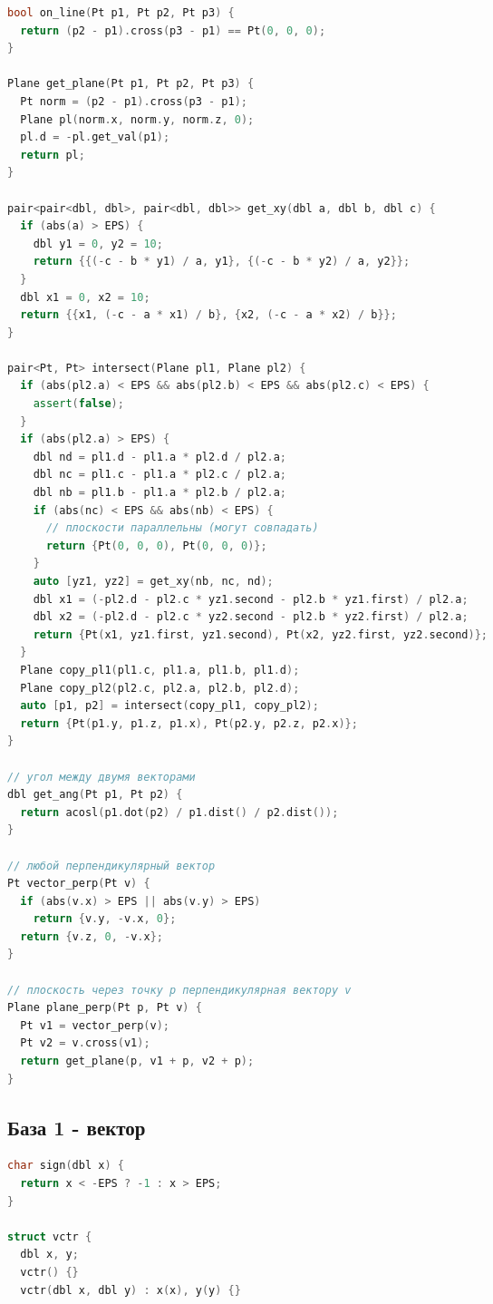 \documentclass[9pt,a4paper,landscape,twosided]{extarticle}
\begin{document}
\begin{multicols*}{3}
\begin{lstlisting}[language=C++]
bool on_line(Pt p1, Pt p2, Pt p3) {
  return (p2 - p1).cross(p3 - p1) == Pt(0, 0, 0);
}

Plane get_plane(Pt p1, Pt p2, Pt p3) {
  Pt norm = (p2 - p1).cross(p3 - p1);
  Plane pl(norm.x, norm.y, norm.z, 0);
  pl.d = -pl.get_val(p1);
  return pl;
}

pair<pair<dbl, dbl>, pair<dbl, dbl>> get_xy(dbl a, dbl b, dbl c) {
  if (abs(a) > EPS) {
    dbl y1 = 0, y2 = 10;
    return {{(-c - b * y1) / a, y1}, {(-c - b * y2) / a, y2}};
  }
  dbl x1 = 0, x2 = 10;
  return {{x1, (-c - a * x1) / b}, {x2, (-c - a * x2) / b}};
}

pair<Pt, Pt> intersect(Plane pl1, Plane pl2) {
  if (abs(pl2.a) < EPS && abs(pl2.b) < EPS && abs(pl2.c) < EPS) {
    assert(false);
  }
  if (abs(pl2.a) > EPS) {
    dbl nd = pl1.d - pl1.a * pl2.d / pl2.a;
    dbl nc = pl1.c - pl1.a * pl2.c / pl2.a;
    dbl nb = pl1.b - pl1.a * pl2.b / pl2.a;
    if (abs(nc) < EPS && abs(nb) < EPS) {
      // плоскости параллельны (могут совпадать)
      return {Pt(0, 0, 0), Pt(0, 0, 0)};
    }
    auto [yz1, yz2] = get_xy(nb, nc, nd);
    dbl x1 = (-pl2.d - pl2.c * yz1.second - pl2.b * yz1.first) / pl2.a;
    dbl x2 = (-pl2.d - pl2.c * yz2.second - pl2.b * yz2.first) / pl2.a;
    return {Pt(x1, yz1.first, yz1.second), Pt(x2, yz2.first, yz2.second)};
  }
  Plane copy_pl1(pl1.c, pl1.a, pl1.b, pl1.d);
  Plane copy_pl2(pl2.c, pl2.a, pl2.b, pl2.d);
  auto [p1, p2] = intersect(copy_pl1, copy_pl2);
  return {Pt(p1.y, p1.z, p1.x), Pt(p2.y, p2.z, p2.x)};
}

// угол между двумя векторами
dbl get_ang(Pt p1, Pt p2) {
  return acosl(p1.dot(p2) / p1.dist() / p2.dist());
}

// любой перпендикулярный вектор
Pt vector_perp(Pt v) {
  if (abs(v.x) > EPS || abs(v.y) > EPS)
    return {v.y, -v.x, 0};
  return {v.z, 0, -v.x};
}

// плоскость через точку p перпендикулярная вектору v
Plane plane_perp(Pt p, Pt v) {
  Pt v1 = vector_perp(v);
  Pt v2 = v.cross(v1);
  return get_plane(p, v1 + p, v2 + p);
}
\end{lstlisting}

\subsection{База 1 - вектор}
\begin{lstlisting}[language=C++]
char sign(dbl x) {
  return x < -EPS ? -1 : x > EPS;
}

struct vctr {
  dbl x, y;
  vctr() {}
  vctr(dbl x, dbl y) : x(x), y(y) {}


\end{lstlisting}
\end{multicols*}
\end{document}
